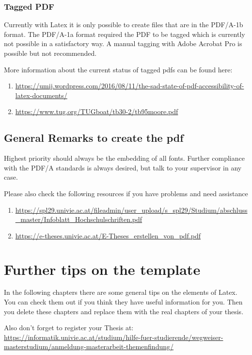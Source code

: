 \subsubsection{Tagged PDF}
Currently with Latex it is only possible to create files that are in the PDF/A-1b format. The PDF/A-1a format required the PDF to be tagged which is currently not possible in a satisfactory way.
A manual tagging with Adobe Acrobat Pro is possible but not recommended.

More information about the current status of tagged pdfs can be found here:
\begin{enumerate}
\item \url{https://umij.wordpress.com/2016/08/11/the-sad-state-of-pdf-accessibility-of-latex-documents/} 
\item \url{https://www.tug.org/TUGboat/tb30-2/tb95moore.pdf}
\end{enumerate}

\subsection{General Remarks to create the pdf}
Highest priority should always be the embedding of all fonts. Further compliance with the PDF/A standards is always desired, but talk to your supervisor in any case.

Please also check the following resources if you have problems and need assistance

\begin{enumerate}
\item \url{https://spl29.univie.ac.at/fileadmin/user_upload/s_spl29/Studium/abschluss_master/Infoblatt_Hochschulschriften.pdf} 
\item \url{https://e-theses.univie.ac.at/E-Theses_erstellen_von_pdf.pdf}
\end{enumerate}

\section{Further tips on the template}
In the following chapters there are some general tips on the elements of Latex. You can check them out if you think they have useful information for you. Then you delete these chapters and replace them with the real chapters of your thesis.

Also don't forget to register your Thesis at:
\url{https://informatik.univie.ac.at/studium/hilfe-fuer-studierende/wegweiser-masterstudium/anmeldung-masterarbeit-themenfindung/}
